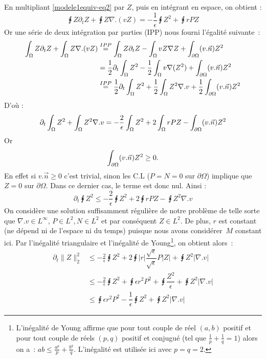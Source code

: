 \documentclass[main.tex]{subfiles}
\begin{document}
En multipliant \eqref{modele1equiv-eq2} par $Z$, puis en intégrant en espace, on obtient :
\begin{equation}
\intx Z \partial_t Z + \intx Z \nabla.(vZ) = - \frac{1}{\epsilon} \intx Z^2 + \intx rPZ
\end{equation}
Or une série de deux intégration par parties (IPP) nous fourni l'égalité suivante~:
\begin{align*}
\int_\Omega Z \partial_t Z + \int_\Omega Z \nabla.(vZ) & \overset{IPP}{=} \int_\Omega Z \partial_t Z - \int_\Omega v Z \nabla Z + \int_{\partial \Omega} (v.\vec{n}) Z^2 \\
&= \frac{1}{2} \partial_t \int_\Omega Z^2 - \frac{1}{2} \int_\Omega v \nabla (Z^2) + \int_{\partial \Omega} (v.\vec{n}) Z^2 \\
& \overset{IPP}{=} \frac{1}{2} \partial_t \int_\Omega Z^2 + \frac{1}{2} \int_\Omega Z^2 \nabla.v + \frac{1}{2} \int_{\partial \Omega} (v.\vec{n}) Z^2 \\
\end{align*}
D'où :
\begin{equation}
\partial_t \int_\Omega Z^2 + \int_\Omega Z^2 \nabla.v = - \frac{2}{\epsilon} \int_\Omega Z^2 + 2 \int_\Omega rPZ - \int_{\partial \Omega} (v.\vec{n}) Z^2
\end{equation}
Or
\begin{equation}
\int_{\partial \Omega} (v.\vec{n}) Z^2 \geq 0.
\end{equation}
En effet si $v.\vec{n} \geq 0$ c'est trivial, sinon les C.L ($P=N=0$ sur $\partial \Omega$) implique que $Z=0$ sur $\partial \Omega$. Dans ce dernier cas, le terme est donc nul. Ainsi :
\begin{equation}
 \partial_t \intx Z^2 \leq - \frac{2}{\epsilon} \intx Z^2 + 2 \intx rPZ - \intx Z^2 \nabla.v
\end{equation}
On considère une solution suffisamment régulière de notre problème de telle sorte que $\nabla.v \in L^\infty$, $P \in L^2, N \in L^2$ et par conséquent $Z \in L^2$. De plus, $r$ est constant (\ie ne dépend ni de l'espace ni du temps) puisque nous avons considérer~$M$ constant ici. Par l'inégalité triangulaire et l'inégalité de Young\footnote{L'inégalité de Young affirme que pour tout couple de réel $(a,b)$ positif et pour tout couple de réels $(p,q)$ positif et conjugué (\ie tel que $\frac{1}{p}+\frac{1}{q}=1$) alors on a~: $ab \leq \frac{a^p}{p} + \frac{b^q}{q}$. L'inégalité est utilisée ici avec $p=q=2$. }, 
on obtient alors~:
\begin{align*}
\partial_t \| Z \|^2_2 & \leq -\frac{2}{\epsilon} \intx Z^2 + 2 \intx  |r| \dfrac{\sqrt{\epsilon}}{\sqrt{\epsilon}} P|Z| + \intx Z^2 | \nabla.v | \\
& \leq -\frac{2}{\epsilon} \intx Z^2 + \intx \epsilon r^2 P^2 + \intx \dfrac{Z^2}{\epsilon}  + \intx Z^2 | \nabla.v | \\
& \leq \intx \epsilon r^2 P^2 - \dfrac{1}{\epsilon} \intx Z^2  + \intx Z^2 | \nabla.v | 
\end{align*}
\end{document}
